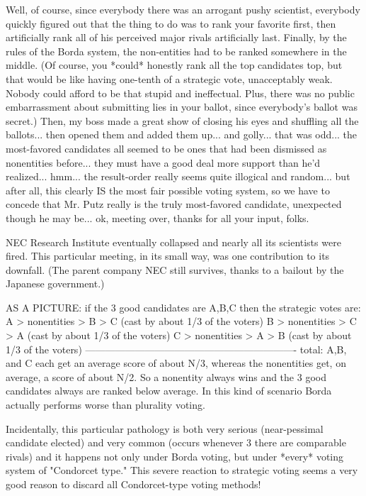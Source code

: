 Well, of course, since everybody there was an arrogant pushy scientist, everybody
quickly figured out that the thing to do was to rank your favorite first,
then artificially rank all of his perceived major rivals artificially last.
Finally, by the rules of the Borda system, the non-entities had to be ranked
somewhere in the middle.  (Of course, you *could* honestly rank all the top candidates
top, but that would be like having one-tenth of a strategic vote, unacceptably weak.
Nobody could afford to be that stupid and ineffectual.  Plus, there was no public
embarrassment about submitting lies in your ballot, since everybody's ballot was secret.)
Then, my boss made a great show of closing his eyes and shuffling all the ballots... 
then opened them and added them up... and golly... that was odd... the 
most-favored candidates all seemed to be ones that had been dismissed as
nonentities before... they must have a good deal more support than he'd 
realized...  hmm... the result-order really seems quite illogical and random... 
but after all, this clearly IS the most fair possible voting system, so we have to
concede that Mr. Putz really is the truly most-favored candidate, unexpected though
he may be... ok, meeting over, thanks for all your input, folks.

NEC Research Institute eventually collapsed and nearly all its scientists were fired.
This particular meeting, in its small way, was one contribution to its downfall.
(The parent company NEC still survives, thanks to a bailout by the Japanese government.)

   AS A PICTURE:  if the 3 good candidates are A,B,C then the strategic votes are:
    A > nonentities > B > C      (cast by about 1/3 of the voters)
    B > nonentities > C > A      (cast by about 1/3 of the voters)
    C > nonentities > A > B      (cast by about 1/3 of the voters)
   ----------------------------------------------------------------
    total:  A,B, and C each get an average score of about N/3, 
       whereas the nonentities get, on average, a score of about N/2.
       So a nonentity always wins and the 3 good candidates always
       are ranked below average.  In this kind of scenario Borda actually
       performs worse than plurality voting.

Incidentally, this particular pathology is both very serious (near-pessimal candidate
elected) and very common (occurs whenever 3 there are comparable rivals) and it 
happens not only under Borda voting, but under *every* voting system of "Condorcet type."
This severe reaction to strategic voting seems a very good reason to discard
all Condorcet-type voting methods!


